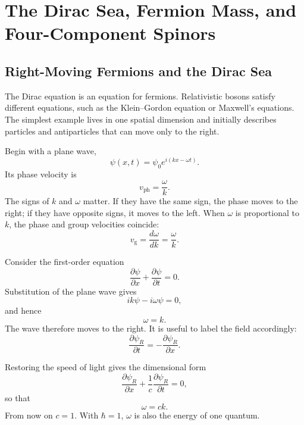 \chapter{The Dirac Sea, Fermion Mass, and Four-Component Spinors}

\section{Right-Moving Fermions and the Dirac Sea}

The Dirac equation is an equation for fermions. Relativistic bosons satisfy different equations, such as the Klein--Gordon equation or Maxwell's equations. The simplest example lives in one spatial dimension and initially describes particles and antiparticles that can move only to the right.

Begin with a plane wave,
\begin{equation}
\psi(x,t)=\psi_0 e^{i(kx-\omega t)}.
\end{equation}
Its phase velocity is
\begin{equation}
v_{\mathrm{ph}}=\frac{\omega}{k}.
\end{equation}
The signs of \(k\) and \(\omega\) matter. If they have the same sign, the phase moves to the right; if they have opposite signs, it moves to the left. When \(\omega\) is proportional to \(k\), the phase and group velocities coincide:
\begin{equation}
v_{\mathrm{g}}=\frac{d\omega}{dk}=\frac{\omega}{k}.
\end{equation}

Consider the first-order equation
\begin{equation}
\frac{\partial\psi}{\partial x}
+
\frac{\partial\psi}{\partial t}
=0.
\end{equation}
Substitution of the plane wave gives
\begin{equation}
ik\psi-i\omega\psi=0,
\end{equation}
and hence
\begin{equation}
\omega=k.
\end{equation}
The wave therefore moves to the right. It is useful to label the field accordingly:
\begin{equation}
\frac{\partial\psi_R}{\partial t}
=
-\frac{\partial\psi_R}{\partial x}.
\end{equation}

Restoring the speed of light gives the dimensional form
\begin{equation}
\frac{\partial\psi_R}{\partial x}
+
\frac{1}{c}\frac{\partial\psi_R}{\partial t}
=0,
\end{equation}
so that
\begin{equation}
\omega=ck.
\end{equation}
From now on \(c=1\). With \(\hbar=1\), \(\omega\) is also the energy of one quantum.

